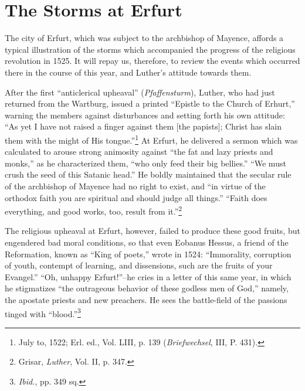 \section{The Storms at Erfurt}

The city of Erfurt, which was subject to the archbishop of Mayence, affords
a typical illustration of the storms which accompanied
the progress of the religious revolution in 1525. It will repay us, therefore,
to review the events which occurred there in the course of this
year, and Luther’s attitude towards them.

After the first “anticlerical upheaval” (\textit{Pfaffensturm}), Luther,
who had just returned from the Wartburg, issued a printed ``Epistle
to the Church of Erhurt,'' warning the members against disturbances
and setting forth his own attitude: “As yet I have not raised a finger
against them [the papists]; Christ has slain them with the might
of His tongue.”\footnote
{July to, 1522; Erl. ed., Vol. LIII, p. 139 (\textit{Briefwechsel}, III, P. 431).}
At Erfurt, he delivered a sermon which was
calculated to arouse strong animosity against “the fat and lazy
priests and monks,” as he characterized them, “who only feed their
big bellies.” “We must crush the seed of this Satanic head.” He
boldly maintained that the secular rule of the archbishop of Mayence
had no right to exist, and “in virtue of the orthodox faith you are
spiritual and should judge all things.” “Faith does everything, and
good works, too, result from it.”\footnote{Grisar, \textit{Luther}, Vol. II, p. 347.}

The religious upheaval at Erfurt, however, failed to produce these
good fruits, but engendered bad moral conditions, so that even
Eobanus Hessus, a friend of the Reformation, known as “King
of poets,” wrote in 1524: “Immorality, corruption of youth, contempt of
learning, and dissensions, such are the fruits of your
Evangel.” “Oh, unhappy Erfurt!”--he cries in a letter of this same
year, in which he stigmatizes “the outrageous behavior of these godless
men of God,” namely, the apostate priests and new preachers.
He sees the battle-field of the passions tinged with “blood.”\footnote
{\textit{Ibid.}, pp. 349 sq.}

